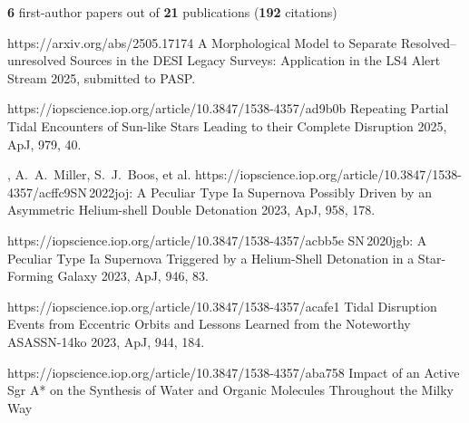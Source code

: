 


\begin{cvpubs}

\cvpub
{ %
{\bf 6} first-author papers out of {\bf 21} publications ({\bf 192} citations)
}
\cvpub
{ %
\begin{cvitems}
    \item {}
    {}
    {https://arxiv.org/abs/2505.17174}
    {A Morphological Model to Separate Resolved--unresolved Sources in the DESI Legacy Surveys: Application in the LS4 Alert Stream}
    {2025, submitted to PASP.}
    \item {}
    {}
    {https://iopscience.iop.org/article/10.3847/1538-4357/ad9b0b}
    {Repeating Partial Tidal Encounters of Sun-like Stars Leading to their Complete Disruption}
    {2025, ApJ, 979, 40.}
    \item \cvsubpub
    {\Cliu, A.~A.~Miller, S.~J.~Boos, et al.}
    {}
    {https://iopscience.iop.org/article/10.3847/1538-4357/acffc9}{SN\,2022joj: A Peculiar Type Ia Supernova Possibly Driven by an Asymmetric Helium-shell Double Detonation}
    {2023, ApJ, 958, 178.}
    \item {}
    {}
    {https://iopscience.iop.org/article/10.3847/1538-4357/acbb5e}
    {SN\,2020jgb: A Peculiar Type Ia Supernova Triggered by a Helium-Shell Detonation in a Star-Forming Galaxy}
    {2023, ApJ, 946, 83.}
    \item {}
    {}
    {https://iopscience.iop.org/article/10.3847/1538-4357/acafe1}
    {Tidal Disruption Events from Eccentric Orbits and Lessons Learned from the Noteworthy ASASSN-14ko}
    {2023, ApJ, 944, 184.}
    \item {}
    {}
    {https://iopscience.iop.org/article/10.3847/1538-4357/aba758}
    {Impact of an Active Sgr A* on the Synthesis of Water and Organic Molecules Throughout the Milky Way}

\end{cvitems}}
\end{cvpubs}
